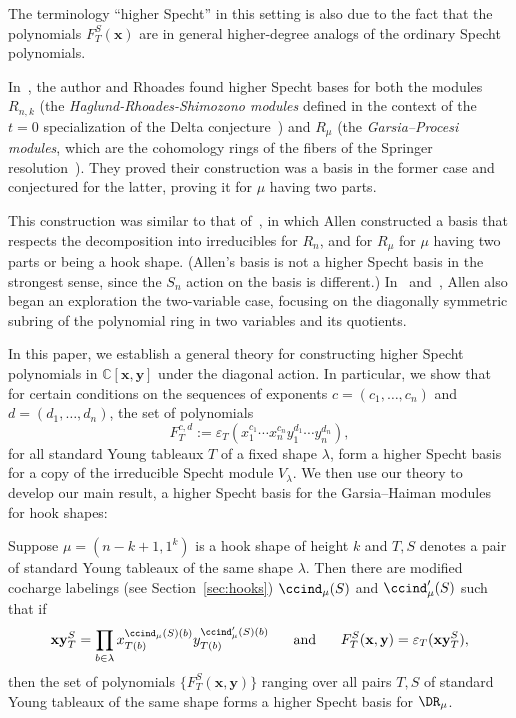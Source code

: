 The terminology ``higher Specht'' in this setting is also due to the fact that the polynomials $F_T^S(\mathbf{x})$ are in general higher-degree analogs of the ordinary Specht polynomials.

In~\cite{GillespieRhoades}, the author and Rhoades found higher Specht bases for both the modules $R_{n,k}$ (the \textit{Haglund-Rhoades-Shimozono modules} defined in the context of the $t=0$ specialization of the Delta conjecture~\cite{HRS}) and $R_\mu$ (the \textit{Garsia--Procesi modules}, which are the cohomology rings of the fibers of the Springer resolution~\cite{DeConciniProcesi,GarsiaProcesi,Tanisaki}).  They proved their construction was a basis in the former case and conjectured for the latter, proving it for $\mu$ having two parts.  

This construction was similar to that of~\cite{AllenOneVariable}, in which Allen constructed a basis that respects the decomposition into irreducibles for $R_n$, and for $R_\mu$ for $\mu$ having two parts or being a hook shape.  (Allen's basis is not a higher Specht basis in the strongest sense, since the $S_n$ action on the basis is different.)  In~\cite{AllenDescentMonomials} and~\cite{AllenBitableaux1}, Allen also began an exploration the two-variable case, focusing on the diagonally symmetric subring of the polynomial ring in two variables and its quotients.  

In this paper, we establish a general theory for constructing higher Specht polynomials in $\mathbb{C}[\mathbf{x},\mathbf{y}]$ under the diagonal action.  In particular, we show that for certain conditions on the sequences of exponents $c=(c_1,\ldots,c_n)$ and $d=(d_1,\ldots,d_n)$, the set of polynomials $$F_T^{c,d}:=\varepsilon_T (x_1^{c_1}\cdots x_n^{c_n}y_1^{d_1}\cdots y_n^{d_n}),$$ for all standard Young tableaux $T$ of a fixed shape $\lambda$, form a higher Specht basis for a copy of the irreducible Specht module $V_\lambda$.  We then use our theory to develop our main result, a higher Specht basis for the Garsia--Haiman modules for hook shapes:

\begin{thm}\label{thm:main}
	Suppose $\mu=(n-k+1,1^k)$ is a hook shape of height $k$ and $T,S$ denotes a pair of standard Young tableaux of the same shape $\lambda$.  Then there are modified cocharge labelings (see Section~\ref{sec:hooks}) $\ccind_\mu(S)$ and $\ccind_\mu'(S)$ such that if $$\mathbf{xy}_T^S=\prod_{b\in \lambda}x^{\ccind_\mu(S)(b)}_{T(b)}y_{T(b)}^{\ccind'_\mu(S)(b)}\hspace{0.5cm}\text{ and }\hspace{0.5cm}F_T^S(\mathbf{x},\mathbf{y})=\varepsilon_T(\mathbf{xy}_T^S),$$ then the set of polynomials $\{F_T^S(\mathbf{x},\mathbf{y})\}$ ranging over all pairs $T,S$ of standard Young tableaux of the same shape forms a higher Specht basis for $\DR_\mu$.
\end{thm}

